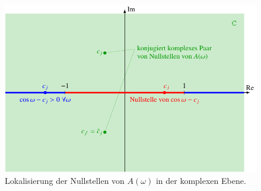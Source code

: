 \begin{figure}
\centering
\includegraphics{chapters/8-kompakt/images/nullstellen.pdf}
\caption{Lokalisierung der Nullstellen von $A(\omega)$ in der komplexen
Ebene.
\label{kompakt:figure:nullstellen}}
\end{figure}


